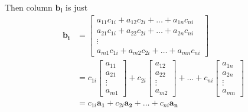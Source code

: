 Then column \(\mathbf{b_i}\) is just 
\begin{align*}\mathbf{b_i}
    &= \begin{bmatrix}a_{11}c_{1i} + a_{12}c_{2i} + \hdots + a_{1n}c_{ni}\\a_{21}c_{1i} + a_{22}c_{2i} + \hdots + a_{2n}c_{ni}\\\vdots\\a_{m1}c_{1i} + a_{m2}c_{2i} + \hdots + a_{mn}c_{ni}\end{bmatrix}\\
    &= c_{1i}\begin{bmatrix}a_{11}\\a_{21}\\\vdots\\a_{m1}\end{bmatrix} + c_{2i}\begin{bmatrix}a_{12}\\a_{22}\\\vdots\\a_{m2}\end{bmatrix} + \hdots + c_{ni}\begin{bmatrix}a_{1n}\\a_{2n}\\\vdots\\a_{mn}\end{bmatrix}\\
    &= c_{1i}\mathbf{a_1} + c_{2i}\mathbf{a_2} + \hdots + c_{ni}\mathbf{a_n}
\end{align*}